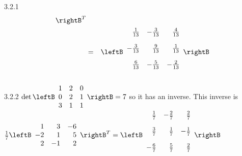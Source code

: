 \begin{Answer}{3.2.1}
\begin{eqnarray*}
\rightB ^{T} \\
&=& \leftB
\begin{array}{rrr}
\vspace{0.05in}\frac{1}{13} & -\vspace{0.05in}\frac{3}{13} & \vspace{0.05in}\frac{4}{13} \\
-\vspace{0.05in}\frac{3}{13} & \vspace{0.05in}\frac{9}{13} & \vspace{0.05in}\frac{1}{13} \\
\vspace{0.05in}\frac{6}{13} & -\vspace{0.05in}\frac{5}{13} & -\vspace{0.05in}\frac{2}{13}
\end{array}
\rightB
\end{eqnarray*}
\end{Answer}
\begin{Answer}{3.2.2}
$\det
\leftB
\begin{array}{ccc}
1 & 2 & 0 \\
0 & 2 & 1 \\
3 & 1 & 1
\end{array}
\rightB = 7$ so it has an inverse. This inverse is $\frac{1}{7}
\leftB
\begin{array}{rrr}
1 & 3 & -6 \\
-2 & 1 & 5 \\
2 & -1 & 2
\end{array}
\rightB^{T} = \leftB
\begin{array}{rrr}
\vspace{0.05in}\frac{1}{7} & -\vspace{0.05in}\frac{2}{7} & \vspace{0.05in}\frac{2}{7} \\
\vspace{0.05in}\frac{3}{7} & \vspace{0.05in}\frac{1}{7} & -\vspace{0.05in}\frac{1}{7} \\
-\vspace{0.05in}\frac{6}{7} & \vspace{0.05in}\frac{5}{7} & \vspace{0.05in}\frac{2}{7}
\end{array}
\rightB $
\end{Answer}
